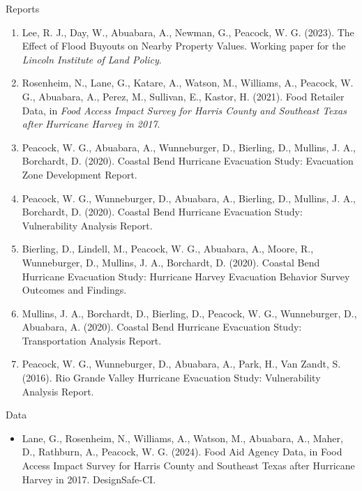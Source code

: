 \documentclass[11pt,oneside]{article}
\begin{document}
\vspace{3pt}

{Reports}
\begin{enumerate}[leftmargin=20pt]
\item Lee, R. J., Day, W., Abuabara, A., Newman, G., Peacock, W. G. (2023). The Effect of Flood Buyouts on Nearby Property Values. Working paper for the \emph{Lincoln Institute of Land Policy}.
\item Rosenheim, N., Lane, G., Katare, A., Watson, M., Williams, A., Peacock, W. G., Abuabara, A., Perez, M., Sullivan, E., Kastor, H. (2021). Food Retailer Data, in \emph{Food Access Impact Survey for Harris County and Southeast Texas after Hurricane Harvey in 2017}.
\item Peacock, W. G., Abuabara, A., Wunneburger, D., Bierling, D., Mullins, J. A., Borchardt, D. (2020). Coastal Bend Hurricane Evacuation Study: Evacuation Zone Development Report.
\item Peacock, W. G., Wunneburger, D., Abuabara, A., Bierling, D., Mullins, J. A., Borchardt, D. (2020). Coastal Bend Hurricane Evacuation Study: Vulnerability Analysis Report.
\item Bierling, D., Lindell, M., Peacock, W. G., Abuabara, A., Moore, R., Wunneburger, D., Mullins, J. A., Borchardt, D. (2020). Coastal Bend Hurricane Evacuation Study: Hurricane Harvey Evacuation Behavior Survey Outcomes and Findings.
\item Mullins, J. A., Borchardt, D., Bierling, D., Peacock, W. G., Wunneburger, D., Abuabara, A. (2020). Coastal Bend Hurricane Evacuation Study: Transportation Analysis Report.
\item Peacock, W. G., Wunneburger, D., Abuabara, A., Park, H., Van Zandt, S. (2016). Rio Grande Valley Hurricane Evacuation Study: Vulnerability Analysis Report.
\end{enumerate}

\vspace{3pt}

{Data}
\begin{itemize}[leftmargin=20pt]
\item Lane, G., Rosenheim, N., Williams, A., Watson, M., Abuabara, A., Maher, D., Rathburn, A., Peacock, W. G. (2024). Food Aid Agency Data, in Food Access Impact Survey for Harris County and Southeast Texas after Hurricane Harvey in 2017. DesignSafe-CI.
\end{itemize}

\vspace{3pt}
\end{document}
